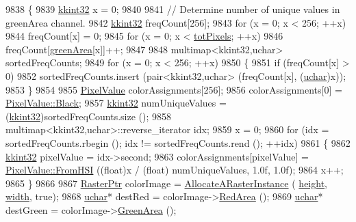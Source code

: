 \begin{DoxyCode}
9838 \{
9839   \hyperlink{namespace_k_k_b_a8fa4952cc84fda1de4bec1fbdd8d5b1b}{kkint32}  x = 0;
9840 
9841   \textcolor{comment}{// Determine number of unique values in greenArea channel.}
9842   \hyperlink{namespace_k_k_b_a8fa4952cc84fda1de4bec1fbdd8d5b1b}{kkint32}  freqCount[256];
9843   \textcolor{keywordflow}{for}  (x = 0;  x < 256;  ++x)
9844     freqCount[x] = 0;
9845   \textcolor{keywordflow}{for}  (x = 0;  x < \hyperlink{class_k_k_b_1_1_raster_a9b08c4a0ca0a35435a478599635f1dc0}{totPixels};  ++x)
9846     freqCount[\hyperlink{class_k_k_b_1_1_raster_ad981258f1f7284a8bd0cd0466f328cdf}{greenArea}[x]]++;
9847 
9848   multimap<kkint32,uchar>  sortedFreqCounts;
9849   \textcolor{keywordflow}{for}  (x = 0;  x < 256;  ++x)
9850   \{
9851     \textcolor{keywordflow}{if}  (freqCount[x] > 0)
9852       sortedFreqCounts.insert (pair<kkint32,uchar> (freqCount[x], (\hyperlink{namespace_k_k_b_ace9969169bf514f9ee6185186949cdf7}{uchar})x));
9853   \}
9854 
9855   \hyperlink{class_k_k_b_1_1_pixel_value}{PixelValue}  colorAssignments[256];
9856   colorAssignments[0] = \hyperlink{class_k_k_b_1_1_pixel_value_af2eb1c2546e02ff0f6c14ab76e604e19}{PixelValue::Black};
9857   \hyperlink{namespace_k_k_b_a8fa4952cc84fda1de4bec1fbdd8d5b1b}{kkint32}  numUniqueValues = (\hyperlink{namespace_k_k_b_a8fa4952cc84fda1de4bec1fbdd8d5b1b}{kkint32})sortedFreqCounts.size ();
9858   multimap<kkint32,uchar>::reverse\_iterator  idx;
9859   x = 0;
9860   \textcolor{keywordflow}{for}  (idx = sortedFreqCounts.rbegin ();  idx != sortedFreqCounts.rend ();  ++idx)
9861   \{
9862     \hyperlink{namespace_k_k_b_a8fa4952cc84fda1de4bec1fbdd8d5b1b}{kkint32}  pixelValue = idx->second;
9863     colorAssignments[pixelValue] = \hyperlink{class_k_k_b_1_1_pixel_value_a1aed38456fe38d925a5fdeb25d94cd6f}{PixelValue::FromHSI} ((\textcolor{keywordtype}{float})x / (\textcolor{keywordtype}{float})
      numUniqueValues, 1.0f, 1.0f);
9864     x++;
9865   \}
9866 
9867   \hyperlink{class_k_k_b_1_1_raster}{RasterPtr}  colorImage = \hyperlink{class_k_k_b_1_1_raster_aa879980d112c01cb7ad9a3cfc7cd6f64}{AllocateARasterInstance} (
      \hyperlink{class_k_k_b_1_1_raster_af39ff189de4fbb6de98392e187efafb7}{height}, \hyperlink{class_k_k_b_1_1_raster_ae0bcc103e191c3421d7692dc69ceb554}{width}, \textcolor{keyword}{true});
9868   \hyperlink{namespace_k_k_b_ace9969169bf514f9ee6185186949cdf7}{uchar}*  destRed   = colorImage->\hyperlink{class_k_k_b_1_1_raster_aa3d0f9b4ce0fdd8ac97f996058d09b22}{RedArea}   ();
9869   \hyperlink{namespace_k_k_b_ace9969169bf514f9ee6185186949cdf7}{uchar}*  destGreen = colorImage->\hyperlink{class_k_k_b_1_1_raster_af6ceacfa7835a295d239d141627dbec7}{GreenArea} ();

\end{DoxyCode}
